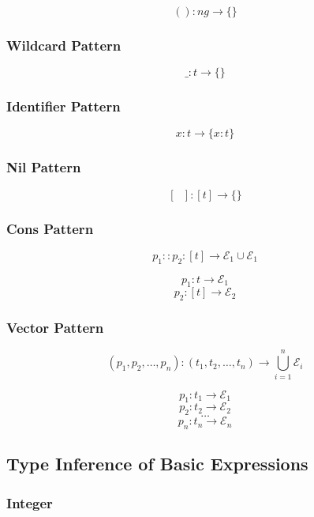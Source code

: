 \documentclass[titlepage]{article}
\begin{document}
$$() : ng \rightarrow \{\}$$

\subsubsection{Wildcard Pattern}

$$\_ : t \rightarrow \{\}$$

\subsubsection{Identifier Pattern}

$$x : t \rightarrow \{x : t\}$$

\subsubsection{Nil Pattern}

$$[\text{ }] : [t] \rightarrow \{\}$$

\subsubsection{Cons Pattern}

$$p_1 :: p_2 : [t] \rightarrow \mathcal{E}_1 \cup \mathcal{E}_1$$

\noindent\makebox[\linewidth]{\rule{1.2in}{0.4pt}}

$$p_1 : t \rightarrow \mathcal{E}_1$$
$$p_2 : [t] \rightarrow \mathcal{E}_2$$

\subsubsection{Vector Pattern}

$$(p_1, p_2, \dots, p_n) : (t_1, t_2, \dots, t_n) \rightarrow \bigcup _ {i = 1} ^ n \mathcal{E}_i$$

\noindent\makebox[\linewidth]{\rule{1.2in}{0.4pt}}

$$p_1 : t_1 \rightarrow \mathcal{E}_1$$
$$p_2 : t_2 \rightarrow \mathcal{E}_2$$
$$\dots$$
$$p_n : t_n \rightarrow \mathcal{E}_n$$


\subsection{Type Inference of Basic Expressions}

\subsubsection{Integer}
\end{document}
